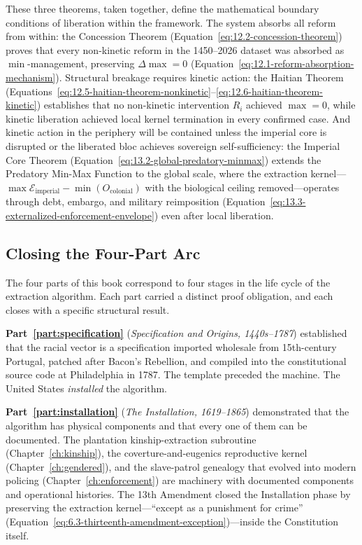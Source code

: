 These three theorems, taken together, define the mathematical boundary conditions of liberation within the framework. The system absorbs all reform from within: the Concession Theorem (Equation~\ref{eq:12.2-concession-theorem}) proves that every non-kinetic reform in the 1450--2026 dataset was absorbed as $\min$-management, preserving $\Delta\max = 0$ (Equation~\ref{eq:12.1-reform-absorption-mechanism}). Structural breakage requires kinetic action: the Haitian Theorem (Equations~\ref{eq:12.5-haitian-theorem-nonkinetic}--\ref{eq:12.6-haitian-theorem-kinetic}) establishes that no non-kinetic intervention $R_i$ achieved $\max = 0$, while kinetic liberation achieved local kernel termination in every confirmed case. And kinetic action in the periphery will be contained unless the imperial core is disrupted or the liberated bloc achieves sovereign self-sufficiency: the Imperial Core Theorem (Equation~\ref{eq:13.2-global-predatory-minmax}) extends the Predatory Min-Max Function to the global scale, where the extraction kernel---$\max \mathcal{E}_{\text{imperial}} - \min(O_{\text{colonial}})$ with the biological ceiling removed---operates through debt, embargo, and military reimposition (Equation~\ref{eq:13.3-externalized-enforcement-envelope}) even after local liberation.

\subsection*{Closing the Four-Part Arc}

The four parts of this book correspond to four stages in the life cycle of the extraction algorithm. Each part carried a distinct proof obligation, and each closes with a specific structural result.

\textbf{Part~\ref{part:specification}} (\textit{Specification and Origins, 1440s--1787}) established that the racial vector is a specification imported wholesale from 15th-century Portugal, patched after Bacon's Rebellion, and compiled into the constitutional source code at Philadelphia in 1787. The template preceded the machine. The United States \textit{installed} the algorithm.

\textbf{Part~\ref{part:installation}} (\textit{The Installation, 1619--1865}) demonstrated that the algorithm has physical components and that every one of them can be documented. The plantation kinship-extraction subroutine (Chapter~\ref{ch:kinship}), the coverture-and-eugenics reproductive kernel (Chapter~\ref{ch:gendered}), and the slave-patrol genealogy that evolved into modern policing (Chapter~\ref{ch:enforcement}) are machinery with documented components and operational histories. The 13th Amendment closed the Installation phase by preserving the extraction kernel---``except as a punishment for crime'' (Equation~\ref{eq:6.3-thirteenth-amendment-exception})---inside the Constitution itself.

